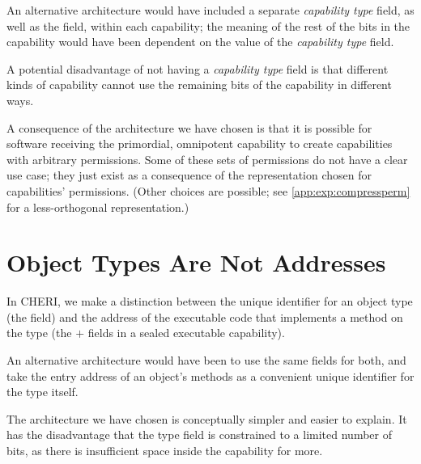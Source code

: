 An alternative architecture would have included a separate
\emph{capability type} field, as well as the \cperms{} field, within each
capability; the meaning of the rest of the bits in the capability would have
been dependent on the value of the \emph{capability type} field.

A potential disadvantage of not having a \emph{capability type} field is that
different kinds of capability cannot use the remaining bits of the capability
in different ways.

A consequence of the architecture we have chosen is that it is possible for
software receiving the primordial, omnipotent capability to create capabilities
with arbitrary permissions.  Some of these sets of permissions do not have a
clear use case; they just exist as a consequence of the representation chosen
for capabilities' permissions.  (Other choices are possible; see
\cref{app:exp:compressperm} for a less-orthogonal representation.)


\section{Object Types Are Not Addresses}

In CHERI, we make a distinction between the unique identifier for an
object type (the \cotype{} field) and the address of the executable code
that implements a method on the type (the \cbase{} $+$ \coffset{} fields
in a sealed executable capability).

An alternative architecture would have been to use the same fields for
both, and take the entry address of an object's methods as a convenient
unique identifier for the type itself.

The architecture we have chosen is conceptually simpler and easier to
explain. It has the disadvantage that the type field is constrained to
a limited number of bits, as there is insufficient space inside the
capability for more.

